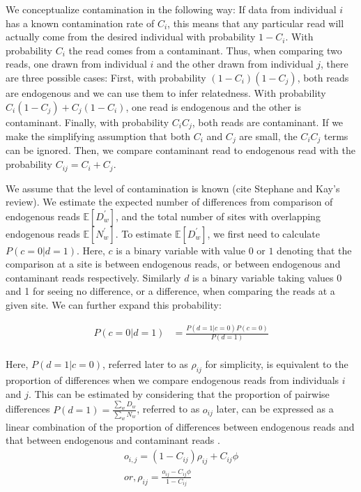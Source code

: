 \documentclass[12pt, letterpaper]{article}
\begin{document}
We conceptualize contamination in the following way: If data from individual $i$ has a known contamination rate of $C_i$, this means that any particular read  will actually come from the desired individual with probability $1-C_i$. With probability $C_i$ the read comes from a contaminant. Thus, when comparing two reads, one drawn from individual $i$ and the other drawn from individual $j$, there are three possible cases: First, with probability $(1-C_i)(1-C_j)$, both reads are endogenous and we can use them to infer relatedness. With probability $C_i(1-C_j) + C_j(1-C_i)$, one read is endogenous and the other is contaminant. Finally, with probability $C_iC_j$, both reads are contaminant. If we make the simplifying assumption that both $C_i$ and $C_j$ are small, the $C_iC_j$ terms  can be ignored. Then, we compare contaminant read to endogenous read with the probability $C_{ij} = C_i + C_j$.

We assume that the level of contamination is known (cite Stephane and Kay's review). We  estimate the expected number of differences from comparison of endogenous reads $\mathbb{E}[D_w^{'}]$, and the total number of sites with overlapping endogenous reads $\mathbb{E}[N_w^{'}]$. To estimate $\mathbb{E}[D_w^{'}]$, we first need to calculate $P(c=0|d=1)$. Here, $c$ is a binary variable with value $0$ or $1$ denoting that the comparison at a site is between endogenous reads, or between endogenous and contaminant reads respectively. Similarly $d$ is a binary variable taking values 0 and 1 for seeing no difference, or a difference, when comparing the reads at a given site. We can further expand this probability:

\begin{align}\label{eq:12a}
    P(c=0|d=1) &= \frac{P(d=1|c=0)P(c=0)}{P(d=1)} \nonumber\\
\end{align}

Here, $P(d=1|c=0)$, referred later to as $\rho_{ij}$ for simplicity, is equivalent to the proportion of differences when we compare endogenous reads from individuals $i$ and $j$. This can be estimated by considering that the proportion of pairwise differences $P(d=1) =\frac{\sum_w D_w}{\sum_w N_w}$, referred to as $o_{ij}$ later, can be expressed as a linear combination of the proportion of differences between endogenous reads and that between endogenous and contaminant reads \cite{peyregne_present-day_2020}. 
\begin{align}\label{eq:13}
    o_{i,j} = (1-C_{ij}) \rho_{ij} + C_{ij} \phi \nonumber\\
    or, \rho_{ij} = \frac{o_{ij} - C_{ij} \phi} {1 - C_{ij}}
\end{align}
\end{document}
